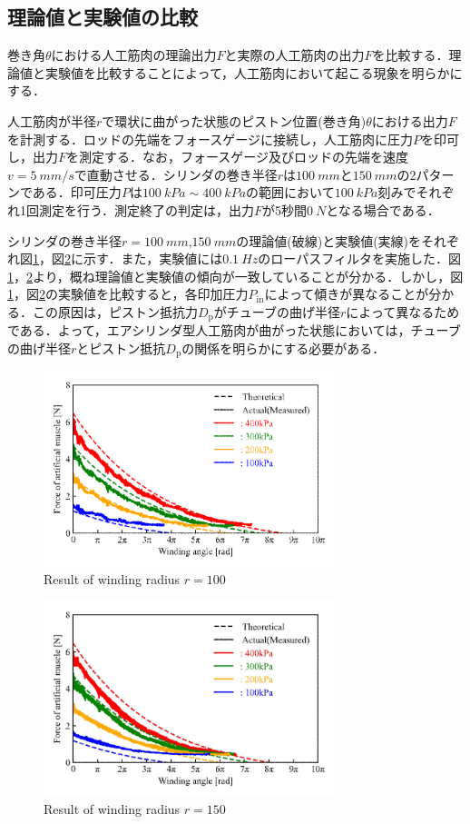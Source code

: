 \subsection{理論値と実験値の比較}%
巻き角$\theta$における人工筋肉の理論出力$F$と実際の人工筋肉の出力$F$を比較する．理論値と実験値を比較することによって，人工筋肉において起こる現象を明らかにする．
\par
人工筋肉が半径$r$で環状に曲がった状態のピストン位置(巻き角)$\theta$における出力$F$を計測する．ロッドの先端をフォースゲージに接続し，人工筋肉に圧力$P$を印可し，出力$F$を測定する．なお，フォースゲージ及びロッドの先端を速度$v=\SI{5}{mm/s}$で直動させる．シリンダの巻き半径$r$は$\SI{100}{mm}$と$\SI{150}{mm}$の2パターンである．印可圧力$P$は$\SI{100}{kPa} \sim \SI{400}{kPa}$の範囲において$\SI{100}{kPa}$刻みでそれぞれ1回測定を行う．測定終了の判定は，出力$F$が5秒間$\SI{0}{N}$となる場合である．
\par
シリンダの巻き半径$r=\SI{100}{mm}$,$\SI{150}{mm}$の理論値(破線)と実験値(実線)をそれぞれ図\ref{r=100mm}，図\ref{r=150mm}に示す．また，実験値には$\SI{0.1}{Hz}$のローパスフィルタを実施した．図\ref{r=100mm}，\ref{r=150mm}より，概ね理論値と実験値の傾向が一致していることが分かる．しかし，図\ref{r=100mm}，図\ref{r=150mm}の実験値を比較すると，各印加圧力$P_\mathrm{in}$によって傾きが異なることが分かる．この原因は，ピストン抵抗力$D_\mathrm{p}$がチューブの曲げ半径$r$によって異なるためである．よって，エアシリンダ型人工筋肉が曲がった状態においては，チューブの曲げ半径$r$とピストン抵抗$D_\mathrm{p}$の関係を明らかにする必要がある．
\begin{figure}[t]
  \centering
  \includegraphics[width=85mm]{_pdf/result_100mm.pdf}
  \caption{Result of winding radius $r=100$}
  \label{r=100mm}
\end{figure}

\begin{figure}[t]
  \centering
  \includegraphics[width=85mm]{_pdf/result_150mm.pdf}
  \caption{Result of winding radius $r=150$}
  \label{r=150mm}
\end{figure}

